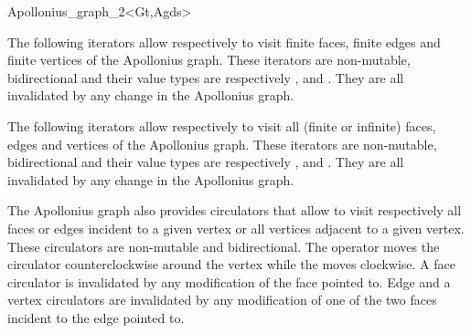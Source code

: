 \begin{ccRefClass}{Apollonius_graph_2<Gt,Agds>}


The following iterators allow respectively to visit 
finite faces,  finite edges and  finite vertices
of the Apollonius graph. These iterators are non-mutable,
bidirectional and their value types are respectively
,  and . 
They are all invalidated by any change in the Apollonius graph.

\ccGlue
{}

\ccGlue
{}

\ccGlue
{}

The following iterators allow respectively to visit all
(finite or infinite) faces, edges and vertices
of the Apollonius graph. These iterators are non-mutable, bidirectional
and their value types are respectively
,  and . 
They are all invalidated by any change in the Apollonius graph.


\ccGlue
{}

\ccGlue
{}

\ccGlue
{}


\ccThreeToTwo




The Apollonius graph also provides circulators that allow to visit 
respectively all faces or edges incident to a given vertex
or all vertices adjacent to a given vertex.
These circulators are non-mutable and bidirectional.
 The operator  moves the circulator
counterclockwise around the vertex while
the  moves clockwise.
A face circulator is invalidated by any modification of the face pointed to.
Edge and a vertex circulators are invalidated by any modification
of one of the two faces incident to the edge pointed to.


\end{ccRefClass}

